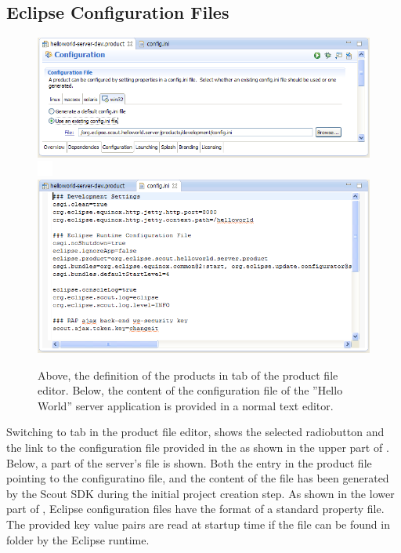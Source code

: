 \documentclass[a4paper,10pt,twoside]{book}
\begin{document}
\subsection{Eclipse Configuration Files}

\begin{figure}
\includegraphics[width=14cm]{sdk_server_dev_product_config.png} \\ 
\includegraphics[height=5mm]{white_pixel.png} \\
\includegraphics[width=14cm]{sdk_server_dev_configini.png} 
\caption{Above, the definition of the products  in tab  of the product file editor.
Below, the content of the configuration file of the ''Hello World'' server application is provided in a normal text editor.
}
\end{figure}

Switching to tab  in the product file editor, shows the selected radiobutton  and the link to the configuration file provided in the  as shown in the upper part of .
Below, a part of the server's  file is shown.
Both the entry in the product file pointing to the configuratino file, and the content of the  file has been generated by the Scout SDK during the initial project creation step.
As shown in the lower part of , Eclipse configuration files have the format of a standard property file.
The provided key value pairs are read at startup time if the  file can be found in folder  by the Eclipse runtime.
\end{document}
